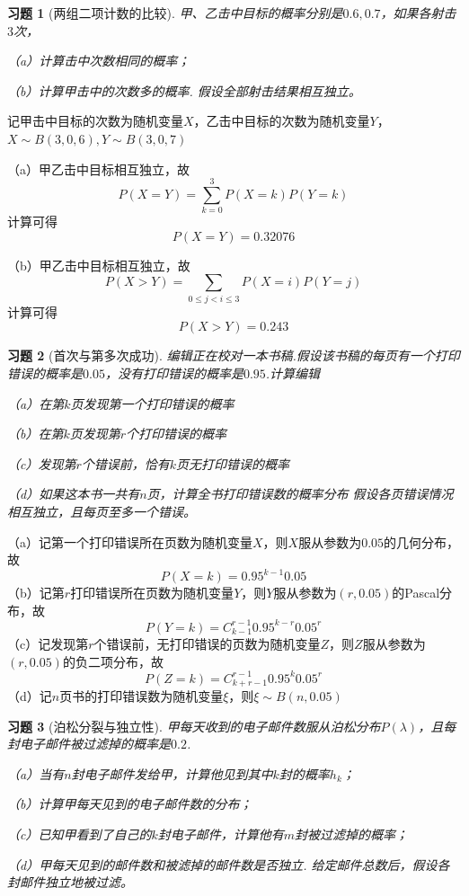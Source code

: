\documentclass[12pt,fontset=fandol]{ctexart}
\newtheorem{exercise}{习题}[section]
\begin{document}
\begin{exercise}[两组二项计数的比较]\label{q:Y3.7}
甲、乙击中目标的概率分别是$0.6,0.7$，如果各射击$3$次，

（a）计算击中次数相同的概率；

（b）计算甲击中的次数多的概率. 假设全部射击结果相互独立。\par{}
\end{exercise}

\begin{solve}\label{a:Y3.7}
记甲击中目标的次数为随机变量$X$，乙击中目标的次数为随机变量$Y$，$X\sim B(3,0,6),Y\sim B(3,0,7)$

（a）甲乙击中目标相互独立，故
\[P(X = Y) = \sum\limits_{k = 0}^3 {P(X = k)P(Y = k)} \]
计算可得
\[P(X = Y) = 0.32076\]

（b）甲乙击中目标相互独立，故
\[P(X > Y) = \sum\limits_{0 \leqslant j < i \leqslant 3} {P(X = i)P(Y = j)} \]
计算可得
\[P(X > Y) = 0.243\]
\end{solve}

\begin{exercise}[首次与第多次成功]\label{q:Y3.8}
编辑正在校对一本书稿.假设该书稿的每页有一个打印错误的概率是$0.05$，没有打印错误的概率是$0.95$.计算编辑

（a）在第$k$页发现第一个打印错误的概率

（b）在第$k$页发现第$r$个打印错误的概率

（c）发现第$r$个错误前，恰有$k$页无打印错误的概率

（d）如果这本书一共有$n$页，计算全书打印错误数的概率分布 假设各页错误情况相互独立，且每页至多一个错误。\par{}
\end{exercise}

\begin{solve}\label{a:Y3.8}
（a）记第一个打印错误所在页数为随机变量$X$，则$X$服从参数为$0.05$的几何分布，故
\[P(X=k)=0.95^{k-1} 0.05\]
（b）记第$r$打印错误所在页数为随机变量$Y$，则$Y$服从参数为$(r,0.05)$的Pascal分布，故
\[P(Y = k) = C_{k - 1}^{r - 1}{0.95^{k - r}}{0.05^r}\]
（c）记发现第$r$个错误前，无打印错误的页数为随机变量$Z$，则$Z$服从参数为$(r,0.05)$的负二项分布，故 
\[P(Z = k) = C_{k + r - 1}^{r - 1}{0.95^k}{0.05^r}\]
（d）记$n$页书的打印错误数为随机变量$\xi$，则$\xi\sim B(n,0.05)$
\end{solve}

\begin{exercise}[泊松分裂与独立性]\label{q:Y3.9}
甲每天收到的电子邮件数服从泊松分布$P(\lambda)$，且每封电子邮件被过滤掉的概率是$0.2$.

（a）当有$n$封电子邮件发给甲，计算他见到其中$k$封的概率$h_k$；

（b）计算甲每天见到的电子邮件数的分布；

（c）已知甲看到了自己的$k$封电子邮件，计算他有$m$封被过滤掉的概率；

（d）甲每天见到的邮件数和被滤掉的邮件数是否独立. 给定邮件总数后，假设各封邮件独立地被过滤。\par{}
\end{exercise}
\end{document}
